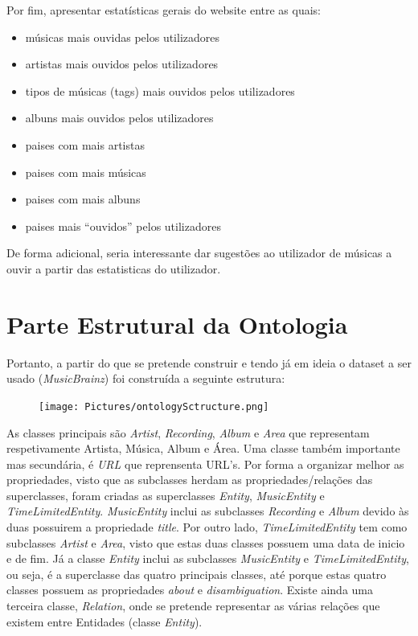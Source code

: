 \documentclass{article}
\begin{document}
Por fim, apresentar estatísticas gerais do website entre as quais:
\begin{itemize}
    \item músicas mais ouvidas pelos utilizadores
    \item artistas mais ouvidos pelos utilizadores
    \item tipos de músicas (tags) mais ouvidos pelos utilizadores
    \item albuns mais ouvidos pelos utilizadores
    \item paises com mais artistas
    \item paises com mais músicas
    \item paises com mais albuns
    \item paises mais ``ouvidos'' pelos utilizadores
\end{itemize}

De forma adicional, seria interessante dar sugestões ao utilizador de músicas a ouvir a partir das estatisticas do utilizador.

\section{Parte Estrutural da Ontologia}

Portanto, a partir do que se pretende construir e tendo já em ideia o dataset a ser usado (\textit{MusicBrainz}) foi construída a seguinte estrutura:

\begin{figure}[H]
        \centering
        \texttt{[image: Pictures/ontologySctructure.png]}
\end{figure}

As classes principais são \textit{Artist}, \textit{Recording}, \textit{Album} e \textit{Area} que representam respetivamente Artista, Música, Album e Área. Uma classe também importante mas secundária, é \textit{URL} que reprensenta URL's. Por forma a organizar melhor as propriedades, visto que as subclasses herdam as propriedades/relações das superclasses, foram criadas as superclasses \textit{Entity}, \textit{MusicEntity} e \textit{TimeLimitedEntity}. \textit{MusicEntity} inclui as subclasses \textit{Recording} e \textit{Album} devido às duas possuirem a propriedade \textit{title}. Por outro lado, \textit{TimeLimitedEntity} tem como subclasses \textit{Artist} e \textit{Area}, visto que estas duas classes possuem uma data de inicio e de fim. Já a classe \textit{Entity} inclui as subclasses \textit{MusicEntity} e \textit{TimeLimitedEntity}, ou seja, é a superclasse das quatro principais classes, até porque estas quatro classes possuem as propriedades \textit{about} e \textit{disambiguation}. Existe ainda uma terceira classe, \textit{Relation}, onde se pretende representar as várias relações que existem entre Entidades (classe \textit{Entity}).
\end{document}
